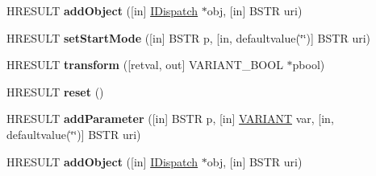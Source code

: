 \begin{DoxyCompactItemize}
\item 
\mbox{\label{interface_m_s_x_m_l2_1_1_i_x_s_l_processor_a8fb859ac26ce214368826b25bbe93def}} 
H\+R\+E\+S\+U\+LT {\bfseries add\+Object} (\mbox{[}in\mbox{]} \hyperlink{interface_i_dispatch}{I\+Dispatch} $\ast$obj, \mbox{[}in\mbox{]} B\+S\+TR uri)
\item 
\mbox{\label{interface_m_s_x_m_l2_1_1_i_x_s_l_processor_a44ba8202ebbf945bc508f9f71697be7d}} 
H\+R\+E\+S\+U\+LT {\bfseries set\+Start\+Mode} (\mbox{[}in\mbox{]} B\+S\+TR p, \mbox{[}in, defaultvalue(\char`\"{}\char`\"{})\mbox{]} B\+S\+TR uri)
\item 
\mbox{\label{interface_m_s_x_m_l2_1_1_i_x_s_l_processor_acfb60471c931018529e7f178850fb673}} 
H\+R\+E\+S\+U\+LT {\bfseries transform} (\mbox{[}retval, out\mbox{]} V\+A\+R\+I\+A\+N\+T\+\_\+\+B\+O\+OL $\ast$pbool)
\item 
\mbox{\label{interface_m_s_x_m_l2_1_1_i_x_s_l_processor_a501afc385ac4ef4db427904db8bb861b}} 
H\+R\+E\+S\+U\+LT {\bfseries reset} ()
\item 
\mbox{\label{interface_m_s_x_m_l2_1_1_i_x_s_l_processor_a5ad9e9ace775c372867e3938a93a06b6}} 
H\+R\+E\+S\+U\+LT {\bfseries add\+Parameter} (\mbox{[}in\mbox{]} B\+S\+TR p, \mbox{[}in\mbox{]} \hyperlink{structtag_v_a_r_i_a_n_t}{V\+A\+R\+I\+A\+NT} var, \mbox{[}in, defaultvalue(\char`\"{}\char`\"{})\mbox{]} B\+S\+TR uri)
\item 
\mbox{\label{interface_m_s_x_m_l2_1_1_i_x_s_l_processor_a8fb859ac26ce214368826b25bbe93def}} 
H\+R\+E\+S\+U\+LT {\bfseries add\+Object} (\mbox{[}in\mbox{]} \hyperlink{interface_i_dispatch}{I\+Dispatch} $\ast$obj, \mbox{[}in\mbox{]} B\+S\+TR uri)
\end{DoxyCompactItemize}
